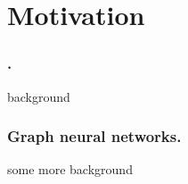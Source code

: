 \section{Motivation}
\label{sec:motivation}
\subsubsection{.}
background 
\subsubsection{Graph neural networks.} 
some more background
